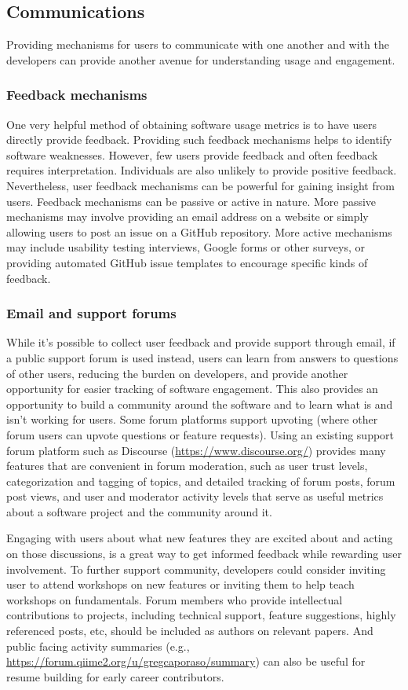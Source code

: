 \documentclass{article}
\begin{document}
\subsection{Communications} 
Providing mechanisms for users to communicate with one another and with the developers can provide another avenue for understanding usage and engagement.

\subsubsection{Feedback mechanisms}
One very helpful method of obtaining software usage metrics is to have users directly provide feedback. Providing such feedback mechanisms helps to identify software weaknesses. However, few users provide feedback and often feedback requires interpretation. Individuals are also unlikely to provide positive feedback. Nevertheless, user feedback mechanisms can be powerful for gaining insight from users. 
Feedback mechanisms can be passive or active in nature. More passive mechanisms may involve providing an email address on a website or simply allowing users to post an issue on a GitHub repository. More active mechanisms may include usability testing interviews, Google forms or other surveys, or providing automated GitHub issue templates to encourage specific kinds of feedback.


\subsubsection{Email and support forums}
While it’s possible to collect user feedback and provide support through email,  if a public support forum is used instead, users can learn from answers to questions of other users, reducing the burden on developers, and provide another opportunity for easier tracking of software engagement. This also provides an opportunity to build a community around the software and to learn what is and isn’t working for users. Some forum platforms support upvoting (where other forum users can upvote questions or feature requests). Using an existing support forum platform such as Discourse (\url{https://www.discourse.org/}) provides many features that are convenient in forum moderation, such as user trust levels, categorization and tagging of topics, and detailed tracking of forum posts, forum post views, and user and moderator activity levels that serve as useful metrics about a software project and the community around it.

Engaging with users about what new features they are excited about and acting on those discussions, is a great way to get informed feedback while rewarding user involvement. To further support community, developers could consider inviting user to attend workshops on new features or inviting them to help teach workshops on fundamentals.  Forum members who provide intellectual contributions to projects, including technical support, feature suggestions, highly referenced posts, etc, should be included as authors on relevant papers. And public facing activity summaries (e.g., \url{https://forum.qiime2.org/u/gregcaporaso/summary}) can also be useful for resume building for early career contributors.
\end{document}
